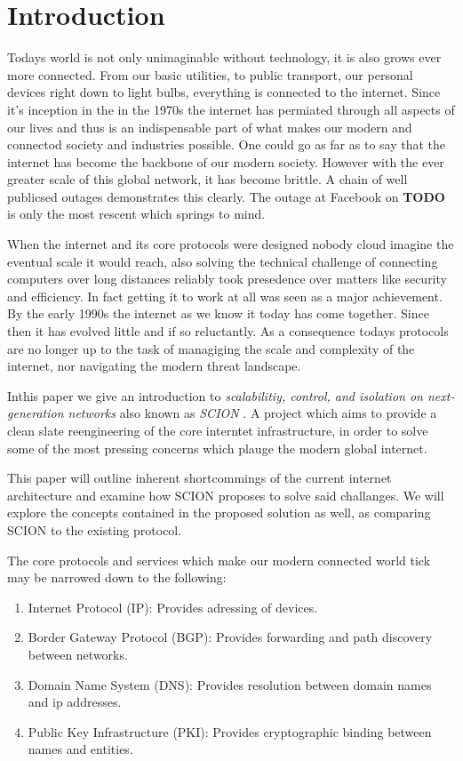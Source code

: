 \documentclass[../eva1_scion.tex]{subfiles}
\begin{document}
\chapter{Introduction}\label{ch:introduction}
\setcounter{page}{1}

Todays world is not only unimaginable without technology, it is also grows ever more connected. From our basic utilities, to public transport, our personal devices right down to light bulbs, everything is connected to the internet. Since it's inception in the in the 1970s the internet has permiated through all aspects of our lives and thus is an indispensable part of what makes our modern and connectod society and industries possible. One could go as far as to say that the internet has become the backbone of our modern society. However with the ever greater scale of this global network, it has become brittle. A chain of well publicsed outages demonstrates this clearly. The outage at Facebook on \textbf{TODO} is only the most rescent which springs to mind.

When the internet and its core protocols were designed nobody cloud imagine the eventual scale it would reach, also solving the technical challenge of connecting computers over long distances reliably took presedence over matters like security and efficiency. In fact getting it to work at all was seen as a major achievement. By the early 1990s the internet as we know it today has come together. Since then it has evolved little and if so reluctantly. As a consequence todays protocols are no longer up to the task of managiging the scale and complexity of the internet, nor navigating the modern threat landscape.

Inthis paper we give an introduction to \textit{scalabilitiy, control, and isolation on next-generation networks} also known as \textit{ SCION }. A project which aims to provide a clean slate reengineering of the core interntet infrastructure, in order to solve some of the most pressing concerns which plauge the modern global internet.

This paper will outline inherent shortcommings of the current  internet architecture and examine how SCION proposes to solve said challanges. We will explore the concepts contained in the proposed solution as well, as comparing SCION to the existing protocol.

The core protocols and services which make our modern connected world tick may be narrowed down to the following:

\begin{enumerate}
    \item Internet Protocol (IP): Provides adressing of devices.
    \item Border Gateway Protocol (BGP): Provides forwarding and path discovery between networks.
    \item Domain Name System (DNS): Provides resolution between domain names and ip addresses.
    \item Public Key Infrastructure (PKI): Provides cryptographic binding between names and entities.
\end{enumerate}
\end{document}
